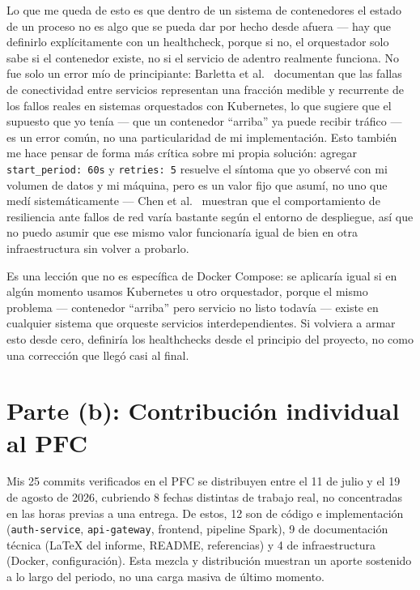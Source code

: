 \documentclass[10pt,journal,a4paper]{IEEEtran}
\begin{document}
Lo que me queda de esto es que dentro de un sistema de contenedores el estado
de un proceso no es algo que se pueda dar por hecho desde afuera --- hay que
definirlo explícitamente con un healthcheck, porque si no, el orquestador
solo sabe si el contenedor existe, no si el servicio de adentro realmente
funciona. No fue solo un error mío de principiante: Barletta et
al.~\cite{barletta2024} documentan que las fallas de conectividad entre
servicios representan una fracción medible y recurrente de los fallos reales
en sistemas orquestados con Kubernetes, lo que sugiere que el supuesto que yo
tenía --- que un contenedor ``arriba'' ya puede recibir tráfico --- es un
error común, no una particularidad de mi implementación. Esto también me hace
pensar de forma más crítica sobre mi propia solución: agregar
\texttt{start\_period: 60s} y \texttt{retries: 5} resuelve el síntoma que yo
observé con mi volumen de datos y mi máquina, pero es un valor fijo que
asumí, no uno que medí sistemáticamente --- Chen et
al.~\cite{chen2025} muestran que el comportamiento de resiliencia ante fallos
de red varía bastante según el entorno de despliegue, así que no puedo
asumir que ese mismo valor funcionaría igual de bien en otra infraestructura
sin volver a probarlo.

Es una lección que no es específica de Docker Compose: se aplicaría igual si
en algún momento usamos Kubernetes u otro orquestador, porque el mismo
problema --- contenedor ``arriba'' pero servicio no listo todavía --- existe
en cualquier sistema que orqueste servicios interdependientes. Si volviera a
armar esto desde cero, definiría los healthchecks desde el principio del
proyecto, no como una corrección que llegó casi al final.

\section{Parte (b): Contribución individual al PFC}

Mis 25 commits verificados en el PFC se distribuyen entre el 11 de julio y el
19 de agosto de 2026, cubriendo 8 fechas distintas de trabajo real, no
concentradas en las horas previas a una entrega. De estos, 12 son de código e
implementación (\texttt{auth-service}, \texttt{api-gateway}, frontend,
pipeline Spark), 9 de documentación técnica (LaTeX del informe, README,
referencias) y 4 de infraestructura (Docker, configuración). Esta mezcla y
distribución muestran un aporte sostenido a lo largo del periodo, no una
carga masiva de último momento.
\end{document}
